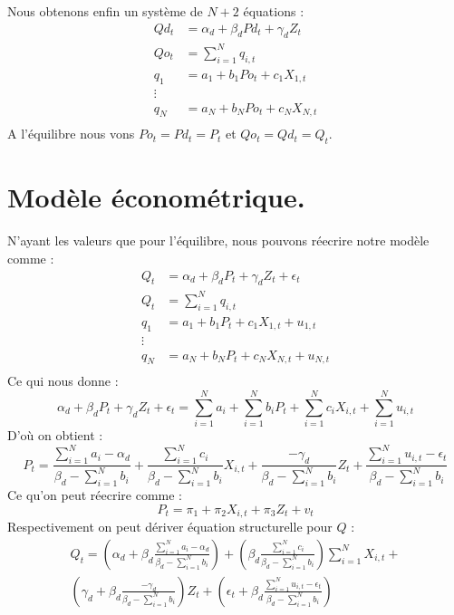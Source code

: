 \documentclass[11pt, a4paper]{article}
\begin{document}
Nous obtenons enfin un système de $N + 2$ équations : 
\begin{align*}
    Qd_t & = \alpha_d + \beta_d Pd_t + \gamma_d Z_t \\
    Qo_t & = \sum_{i = 1}^{N} q_{i,t} \\
    q_1 & = a_1 + b_1 Po_{t} + c_1 X_{1,t} \\ 
    \vdots \\ 
    q_N & = a_N + b_N Po_{t} + c_N X_{N,t} \\
\end{align*}
A l'équilibre nous vons $Po_t = Pd_t = P_t$ et $Qo_t = Qd_t = Q_t$.

\section*{Modèle économétrique.}
N'ayant les valeurs que pour l'équilibre, nous pouvons réecrire notre modèle comme :
\begin{align*}
  Q_t & = \alpha_d + \beta_d P_t + \gamma_d Z_t + \epsilon_t \\
  Q_t & = \sum_{i = 1}^{N} q_{i,t} \\
  q_1 & = a_1 + b_1 P_{t} + c_1 X_{1,t} + u_{1,t}\\ 
  \vdots \\ 
  q_N & = a_N + b_N P_{t} + c_N X_{N,t} + u_{N,t}\\
\end{align*}
Ce qui nous donne : 
\begin{equation}
    \alpha_d + \beta_d P_t + \gamma_d Z_t + \epsilon_t = 
        \sum_{i = 1}^{N} a_i + \sum_{i = 1}^{N} b_i P_t + \sum_{i = 1}^{N} c_i X_{i,t} + \sum_{i = 1}^{N} u_{i,t}
\end{equation}
D'où on obtient :
\begin{equation}
    P_t = \frac{\sum_{i = 1}^{N} a_i - \alpha_d}{\beta_d - \sum_{i = 1}^{N} b_i} + 
        \frac{\sum_{i = 1}^{N} c_i}{\beta_d - \sum_{i = 1}^{N} b_i} X_{i,t} +
        \frac{-\gamma_d}{\beta_d - \sum_{i = 1}^{N} b_i} Z_t + 
        \frac{\sum_{i = 1}^{N} u_{i,t} - \epsilon_t}{\beta_d - \sum_{i = 1}^{N} b_i}
\end{equation}
Ce qu'on peut réecrire comme :
\begin{equation}
  P_t = \pi_1 + 
      \pi_2 X_{i,t} +
      \pi_3 Z_t + 
      v_t
\end{equation}
Respectivement on peut dériver équation structurelle pour $Q$ :
\begin{multline}
    Q_t = (\alpha_d + \beta_d \frac{\sum_{i = 1}^{N} a_i - \alpha_d}{\beta_d - \sum_{i = 1}^{N} b_i}) + 
        (\beta_d \frac{\sum_{i = 1}^{N} c_i}{\beta_d - \sum_{i = 1}^{N} b_i}) \sum_{i = 1}^{N} X_{i,t} + \\
        (\gamma_d + \beta_d \frac{-\gamma_d}{\beta_d - \sum_{i = 1}^{N} b_i}) Z_t + 
        (\epsilon_t + \beta_d \frac{\sum_{i = 1}^{N} u_{i,t} - \epsilon_t}{\beta_d - \sum_{i = 1}^{N} b_i})
\end{multline}
\end{document}
